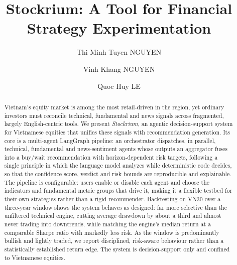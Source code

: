 \documentclass[runningheads]{llncs}
\begin{document}
%
\title{Stockrium: A Tool for Financial Strategy Experimentation}
%
%
\author{Thi Minh Tuyen NGUYEN \and
Vinh Khang NGUYEN \and
Quoc Huy LE}
%
%
%
\maketitle              %
%
\begin{abstract}
Vietnam's equity market is among the most retail-driven in the region, yet
ordinary investors must reconcile technical, fundamental and news signals across
fragmented, largely English-centric tools. We present \emph{Stockrium}, an
agentic decision-support system for Vietnamese equities that unifies these signals
with recommendation generation. Its core is a multi-agent LangGraph pipeline: an
orchestrator dispatches, in parallel, technical, fundamental and news-sentiment
agents whose outputs an aggregator fuses into a buy/wait recommendation with
horizon-dependent risk targets, following a single principle in which the language
model analyzes while deterministic code decides, so that the confidence score,
verdict and risk bounds are reproducible and explainable. The pipeline is
configurable: users enable or disable each agent and choose the indicators and
fundamental metric groups that drive it, making it a flexible testbed for their
own strategies rather than a rigid recommender. Backtesting on VN30 over a
three-year window shows the system behaves as designed: far more selective than
the unfiltered technical engine, cutting average drawdown by about a third and
almost never trading into downtrends, while matching the engine's median return at
a comparable Sharpe ratio with markedly less risk. As the window is predominantly
bullish and lightly traded, we report disciplined, risk-aware behaviour rather
than a statistically established return edge. The
system is decision-support only and confined to Vietnamese equities.

\end{abstract}
%
%
%
\end{document}
